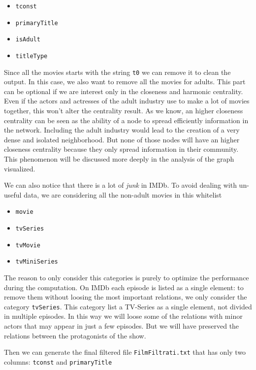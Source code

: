 \begin{itemize}
    \item \texttt{tconst}
    \item \texttt{primaryTitle}
    \item \texttt{isAdult}
    \item \texttt{titleType}
\end{itemize}
Since all the movies starts with the string \texttt{t0} we can remove it to clean the output. In this case, we also want to remove all the movies for adults. This part can be optional if we are interest only in the closeness and harmonic centrality. Even if the actors and actresses of the adult industry use to make a lot of movies together, this won't alter the centrality result. As we know, an higher closeness centrality can be seen as the ability of a node to spread efficiently information in the network. Including the adult industry would lead to the creation of a very dense and isolated neighborhood. But none of those nodes will have an higher closeness centrality because they only spread information in their community. This phenomenon will be discussed more deeply in the analysis of the graph visualized. \s

\noindent We can also notice that there is a lot of \emph{junk} in IMDb. To avoid dealing with un-useful data, we are considering all the non-adult movies in this whitelist

\begin{itemize}
    \item \texttt{movie}
    \item \texttt{tvSeries}
    \item \texttt{tvMovie}
    \item \texttt{tvMiniSeries}
\end{itemize}
The reason to only consider this categories is purely to optimize the performance during the computation. On IMDb each episode is listed as a single element: to remove them without loosing the most important relations, we only consider the category \texttt{tvSeries}. This category list a TV-Series as a single element, not divided in multiple episodes. In this way we will loose some of the relations with minor actors that may appear in just a few episodes. But we will have preserved the relations between the protagonists of the show. \s

\noindent Then we can generate the final filtered file \texttt{FilmFiltrati.txt} that has only two columns: \texttt{tconst} and \texttt{primaryTitle}

